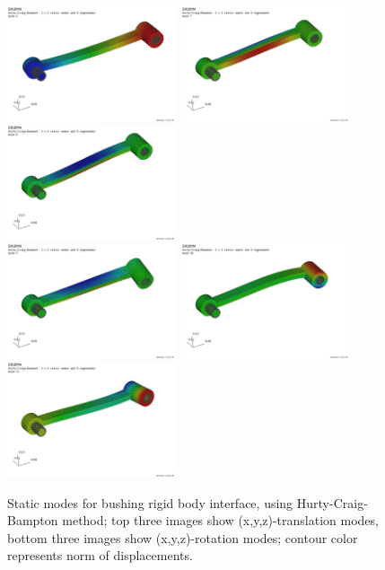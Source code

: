 \begin{figure}[tbph]
  \begin{center}
  \includegraphics[width=5cm]{figures/modesHinge/HCBmodesHingeStaticBx}
  \includegraphics[width=5cm]{figures/modesHinge/HCBmodesHingeStaticBy}
  \includegraphics[width=5cm]{figures/modesHinge/HCBmodesHingeStaticBz}\\
  \includegraphics[width=5cm]{figures/modesHinge/HCBmodesHingeStaticBrotX}
  \includegraphics[width=5cm]{figures/modesHinge/HCBmodesHingeStaticBrotY}
  \includegraphics[width=5cm]{figures/modesHinge/HCBmodesHingeStaticBrotZ}
  \end{center}
  \caption{Static modes for bushing rigid body interface, using Hurty-Craig-Bampton method; top three images show (x,y,z)-translation modes, bottom three images show (x,y,z)-rotation modes; contour color represents norm of displacements.}
	\label{fig_hingePartStaticModesB}
\end{figure}

